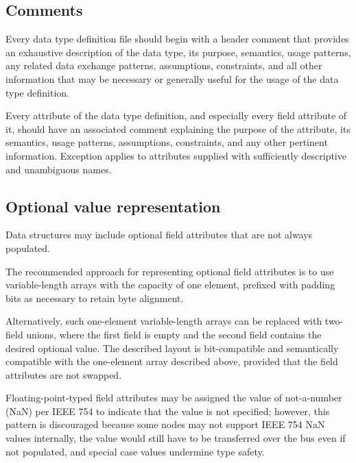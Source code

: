 \subsection{Comments}

Every data type definition file should begin with a header comment that provides an exhaustive description
of the data type, its purpose, semantics, usage patterns, any related data exchange patterns,
assumptions, constraints, and all other information that may be necessary or generally useful for the usage of the
data type definition.

Every attribute of the data type definition, and especially every field attribute of it,
should have an associated comment explaining the purpose of the attribute, its semantics, usage patterns,
assumptions, constraints, and any other pertinent information.
Exception applies to attributes supplied with sufficiently descriptive and unambiguous names.


\subsection{Optional value representation}

Data structures may include optional field attributes that are not always populated.

The recommended approach for representing optional field attributes
is to use variable-length arrays with the capacity of one element,
prefixed with padding bits as necessary to retain byte alignment.

Alternatively, such one-element variable-length arrays can be replaced with two-field unions,
where the first field is empty and the second field contains the desired optional value.
The described layout is bit-compatible and semantically compatible with the one-element array described above,
provided that the field attributes are not swapped.

Floating-point-typed field attributes may be assigned the value of not-a-number (NaN) per IEEE 754
to indicate that the value is not specified;
however, this pattern is discouraged because some nodes may not support IEEE 754 NaN values internally,
the value would still have to be transferred over the bus even if not populated,
and special case values undermine type safety.

